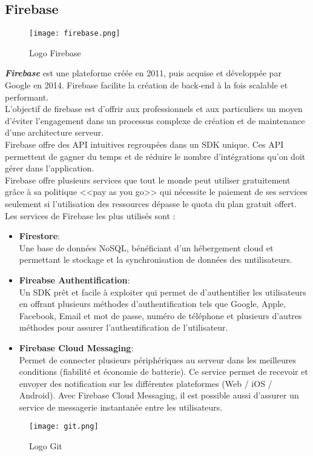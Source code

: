 \subsection{Firebase}
\vspace{1cm}
\begin{figure}[H]
    \centering
    \texttt{[image: firebase.png]}
    \vspace{1cm}
    \captionsetup{justification=centering}

    \caption{Logo Firebase}
    \label{fig:firebase_logo}
\end{figure}
\textit{\textbf{Firebase}} \cite{firebase} est une plateforme créée en 2011, puis acquise et développée par Google en 2014. Firebase facilite la création de back-end à la fois scalable et performant.\\
\noindent L'objectif de firebase est d'offrir aux professionnels et aux particuliers un moyen d'éviter l'engagement dans un processus complexe de création et de maintenance d'une architecture serveur.\\
\noindent Firebase offre des API intuitives regroupées dans un SDK unique. Ces API permettent de gagner du temps et de réduire le nombre d'intégrations qu'on doit gérer dans l'application.\\
\noindent Firebase offre plusieurs services que tout le monde peut utiliser gratuitement grâce à sa politique <<pay as you go>> qui nécessite le paiement de ses services seulement si l'utilisation des ressources dépasse le quota du plan gratuit offert. Les services de Firebase les plus utilisés sont :
\begin{itemize}
    \item \textbf{Firestore}:\\ Une base de données NoSQL, bénéficiant d'un hébergement cloud et permettant le stockage et la synchronisation de données des untilisateurs.
    \item \textbf{Fireabse Authentification}:\\ Un SDK prêt et facile à exploiter qui permet de d'authentifier les utilisateurs en offrant plusieurs méthodes d'authentification tels que Google, Apple, Facebook, Email et mot de passe, numéro de téléphone et plusieurs d'autres méthodes pour assurer l'authentification de l'utilisateur.
    \item \textbf{Firebase Cloud Messaging}:\\ Permet de connecter plusieurs périphériques au serveur dans les meilleures conditions (fiabilité et économie de batterie). Ce service permet de recevoir et envoyer des notification sur les différentes plateformes (Web / iOS / Android). Avec Firebase Cloud Messaging, il est possible aussi d'assurer un service de messagerie instantanée entre les utilisateurs.
\end{itemize}
\begin{figure}[H]
    \centering
    \texttt{[image: git.png]}
    \vspace{1cm}
    \captionsetup{justification=centering}
    \caption{Logo Git}
    \label{fig:git_logo}
\end{figure}
